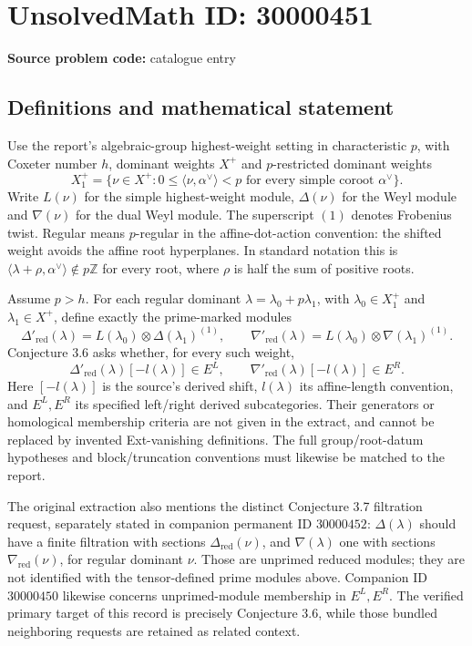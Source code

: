 \documentclass[11pt]{article}
\newcommand{\Z}{\mathbb{Z}}
\begin{document}
\section*{UnsolvedMath ID: 30000451}
\textbf{Source problem code:} catalogue entry
\subsection{Definitions and mathematical statement}
Use the report's algebraic-group highest-weight setting in characteristic $p$, with Coxeter number $h$, dominant weights $X^+$ and $p$-restricted dominant weights
\[
 X_1^+=\{\nu\in X^+:0\le\langle\nu,\alpha^\vee\rangle<p
                              \text{ for every simple coroot }\alpha^\vee\}.
\]
Write $L(\nu)$ for the simple highest-weight module, $\Delta(\nu)$ for the Weyl module and $\nabla(\nu)$ for the dual Weyl module. The superscript $(1)$ denotes Frobenius twist. Regular means $p$-regular in the affine-dot-action convention: the shifted weight avoids the affine root hyperplanes. In standard notation this is $\langle\lambda+\rho,\alpha^\vee\rangle\notin p\Z$ for every root, where $\rho$ is half the sum of positive roots.

Assume $p>h$. For each regular dominant $\lambda=\lambda_0+p\lambda_1$, with $\lambda_0\in X_1^+$ and $\lambda_1\in X^+$, define exactly the prime-marked modules
\[
 \Delta'_{\mathrm{red}}(\lambda)
       =L(\lambda_0)\otimes\Delta(\lambda_1)^{(1)},\qquad
 \nabla'_{\mathrm{red}}(\lambda)
       =L(\lambda_0)\otimes\nabla(\lambda_1)^{(1)}.
\]
Conjecture 3.6 asks whether, for every such weight,
\[
 \Delta'_{\mathrm{red}}(\lambda)[-l(\lambda)]\in E^L,
 \qquad
 \nabla'_{\mathrm{red}}(\lambda)[-l(\lambda)]\in E^R.
\]
Here $[-l(\lambda)]$ is the source's derived shift, $l(\lambda)$ its affine-length convention, and $E^L,E^R$ its specified left/right derived subcategories. Their generators or homological membership criteria are not given in the extract, and cannot be replaced by invented Ext-vanishing definitions. The full group/root-datum hypotheses and block/truncation conventions must likewise be matched to the report.

The original extraction also mentions the distinct Conjecture 3.7 filtration request, separately stated in companion permanent ID $30000452$: $\Delta(\lambda)$ should have a finite filtration with sections $\Delta_{\mathrm{red}}(\nu)$, and $\nabla(\lambda)$ one with sections $\nabla_{\mathrm{red}}(\nu)$, for regular dominant $\nu$. Those are unprimed reduced modules; they are not identified with the tensor-defined prime modules above. Companion ID $30000450$ likewise concerns unprimed-module membership in $E^L,E^R$. The verified primary target of this record is precisely Conjecture 3.6, while those bundled neighboring requests are retained as related context.
\end{document}
